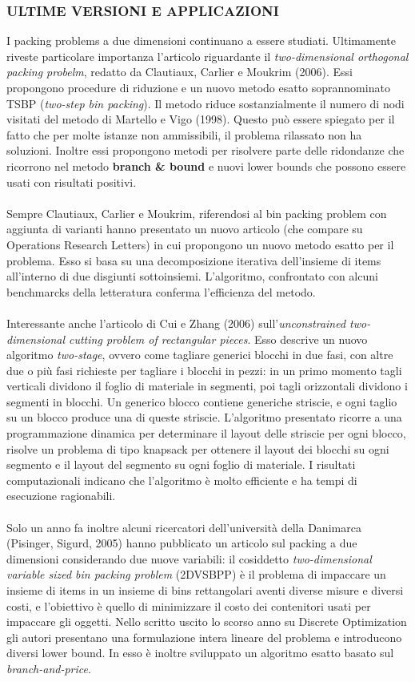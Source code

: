 \documentclass[12pt,a4paper,openright,twoside]{report}
\begin{document}
\subsubsection{ULTIME VERSIONI E APPLICAZIONI}
I packing problems a due dimensioni continuano a essere studiati. Ultimamente riveste particolare importanza l'articolo riguardante il \textit{two-dimensional orthogonal packing probelm}, redatto da Clautiaux, Carlier e Moukrim (2006). Essi propongono procedure di riduzione e un nuovo metodo esatto soprannominato TSBP (\textit{two-step bin packing}). Il metodo riduce sostanzialmente il numero di nodi visitati del metodo di Martello e Vigo (1998). Questo pu\`{o} essere spiegato per il fatto che per molte istanze non ammissibili, il problema rilassato non ha soluzioni. Inoltre essi propongono metodi per risolvere parte delle ridondanze che ricorrono nel metodo \textbf{branch \& bound} e nuovi lower bounds che possono essere usati con risultati positivi.\\
\\Sempre Clautiaux, Carlier e Moukrim, riferendosi al bin packing problem con aggiunta di varianti hanno presentato un nuovo articolo (che compare su Operations Research Letters) in cui propongono un nuovo metodo esatto per il problema. Esso si basa su una decomposizione iterativa dell'insieme di items all'interno di due disgiunti sottoinsiemi. L'algoritmo, confrontato con alcuni benchmarcks della letteratura conferma l'efficienza del metodo.\\
\\Interessante anche l'articolo di Cui e Zhang (2006) sull'\textit{unconstrained two-dimensional cutting problem of rectangular pieces}. Esso descrive un nuovo algoritmo \textit{two-stage}, ovvero come tagliare generici blocchi in due fasi, con altre due o pi\`{u} fasi richieste per tagliare i blocchi in pezzi: in un primo momento tagli verticali dividono il foglio di materiale in segmenti, poi tagli orizzontali dividono i segmenti in blocchi. Un generico blocco contiene generiche striscie, e ogni taglio su un blocco produce una di queste striscie. L'algoritmo presentato ricorre a una programmazione dinamica per determinare il layout delle striscie per ogni blocco, risolve un problema di tipo knapsack per ottenere il layout dei blocchi su ogni segmento e il layout del segmento su ogni foglio di materiale. I risultati computazionali indicano che l'algoritmo \`{e} molto efficiente e ha tempi di esecuzione ragionabili.\\
\\Solo un anno fa inoltre alcuni ricercatori dell'universit\`{a} della Danimarca (Pisinger, Sigurd, 2005) hanno pubblicato un articolo sul packing a due dimensioni considerando due nuove variabili: il cosiddetto \textit{two-dimensional variable sized bin packing problem} (2DVSBPP) \`{e} il problema di impaccare un insieme di items in un insieme di bins rettangolari aventi diverse misure e diversi costi, e l'obiettivo \`{e} quello di minimizzare il costo dei contenitori usati per impaccare gli oggetti. Nello scritto uscito lo scorso anno su Discrete Optimization gli autori presentano una formulazione intera lineare del problema e introducono diversi lower bound. In esso \`{e} inoltre sviluppato un algoritmo esatto basato sul \textit{branch-and-price}.
\end{document}
